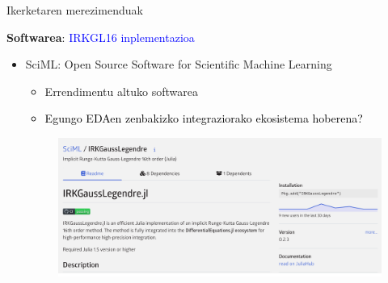 \documentclass[
 10pt,%
 compress,%
 t,       %
 xcolor=svgnames
]{beamer}
\theoremstyle{definition} \newtheorem{definicion}{Definicion}[section]
\theoremstyle{propiedades} \newtheorem{propiedades}{Propiedades}[section]
\begin{document}

\begin{frame}{Ikerketaren merezimenduak} 
	
	
	\medskip
	\medskip
	\textbf{Softwarea}: \textcolor{blue}{IRKGL16 inplementazioa}
	\small
	
	\medskip
	\begin{itemize}
		\item  SciML: Open Source Software for Scientific Machine Learning
		\begin{itemize}
			\item Errendimentu altuko softwarea
			\item  \textcolor{black}{Egungo EDAen zenbakizko integraziorako ekosistema hoberena? }
		\end{itemize}
		\begin{figure}
			\begin{minipage}{1.\textwidth}
				\colorbox{white}  {\includegraphics[width=0.8\linewidth]{SCIMLIRKGaussLegendre2023}}
			\end{minipage}
		\end{figure}
		
		

		
		
	\end{itemize}
	
\end{frame}
\end{document}
